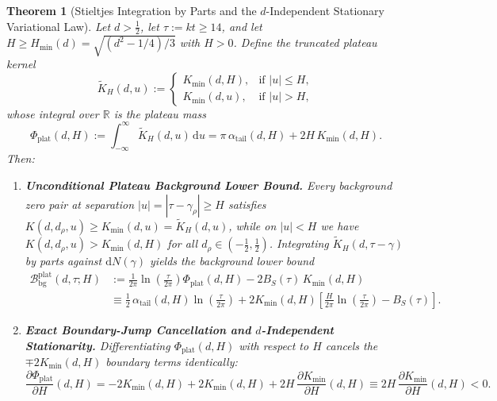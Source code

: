 \documentclass[11pt,reqno]{amsart}
\newtheorem{theorem}{Theorem}[section]
\theoremstyle{definition}
\theoremstyle{remark}
\numberwithin{equation}{section}
\newcommand{\R}{\mathbb{R}}
\newcommand{\dd}{\mathrm{d}}
\begin{document}
\begin{theorem}[Stieltjes Integration by Parts and the $d$-Independent Stationary Variational Law]\label{thm:stationary_law}
Let $d > \frac{1}{2}$, let $\tau := kt \ge 14$, and let $H \ge H_{\min}(d) = \sqrt{(d^2 - 1/4)/3}$ with $H > 0$. Define the truncated plateau kernel
\begin{equation}\label{eq:K_plat_def}
\widetilde{K}_H(d,u) := \begin{cases}
K_{\min}(d,H), & \text{if } |u| \le H, \\
K_{\min}(d,u), & \text{if } |u| > H,
\end{cases}
\end{equation}
whose integral over $\R$ is the plateau mass
\begin{equation}\label{eq:Phi_plat_def}
\Phi_{\mathrm{plat}}(d,H) := \int_{-\infty}^{\infty} \widetilde{K}_H(d,u)\,\dd u = \pi\,\alpha_{\mathrm{tail}}(d,H) + 2H\,K_{\min}(d,H).
\end{equation}
Then:
\begin{enumerate}[label=\textup{(\roman*)},leftmargin=2.2em]
\item \textbf{Unconditional Plateau Background Lower Bound.} Every background zero pair at separation $|u| = |\tau - \gamma_\rho| \ge H$ satisfies $K(d, d_\rho, u) \ge K_{\min}(d,u) = \widetilde{K}_H(d,u)$, while on $|u| < H$ we have $K(d, d_\rho, u) > K_{\min}(d,H)$ for all $d_\rho \in (-\frac{1}{2}, \frac{1}{2})$. Integrating $\widetilde{K}_H(d, \tau - \gamma)$ by parts against $\dd N(\gamma)$ yields the background lower bound
\begin{equation}\label{eq:B_bg_plat_def}
\begin{aligned}
\mathcal{B}_{\mathrm{bg}}^{\mathrm{plat}}(d,\tau;H) &:= \frac{1}{2\pi}\ln\!\left(\frac{\tau}{2\pi}\right)\Phi_{\mathrm{plat}}(d,H) - 2B_S(\tau)\,K_{\min}(d,H) \\
&\equiv \frac{1}{2}\,\alpha_{\mathrm{tail}}(d,H)\ln\!\left(\frac{\tau}{2\pi}\right) + 2K_{\min}(d,H)\left[\frac{H}{2\pi}\ln\!\left(\frac{\tau}{2\pi}\right) - B_S(\tau)\right].
\end{aligned}
\end{equation}
\item \textbf{Exact Boundary-Jump Cancellation and $d$-Independent Stationarity.} Differentiating $\Phi_{\mathrm{plat}}(d,H)$ with respect to $H$ cancels the $\mp 2K_{\min}(d,H)$ boundary terms identically:
\begin{equation}\label{eq:dPhi_dH}
\frac{\partial\Phi_{\mathrm{plat}}}{\partial H}(d,H) = -2K_{\min}(d,H) + 2K_{\min}(d,H) + 2H\,\frac{\partial K_{\min}}{\partial H}(d,H) \equiv 2H\,\frac{\partial K_{\min}}{\partial H}(d,H) < 0.

\end{equation}
\end{enumerate}
\end{theorem}
\end{document}
